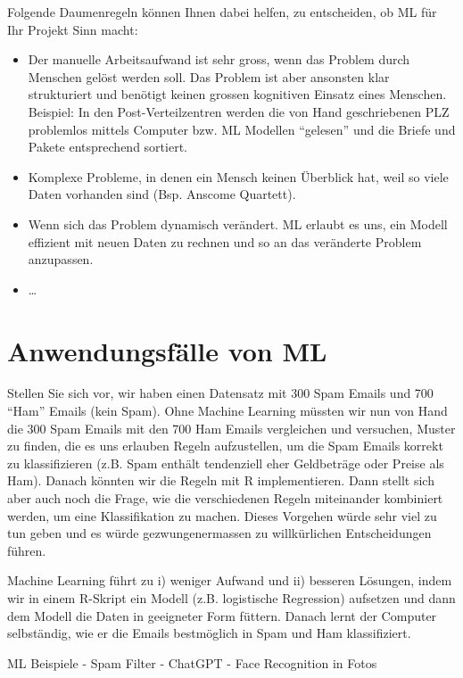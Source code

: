 \documentclass[
]{book}
\providecommand{\tightlist}{%
  \setlength{\itemsep}{0pt}\setlength{\parskip}{0pt}}
\begin{document}
Folgende Daumenregeln können Ihnen dabei helfen, zu entscheiden, ob ML für Ihr Projekt Sinn macht:

\begin{itemize}
\tightlist
\item
  Der manuelle Arbeitsaufwand ist sehr gross, wenn das Problem durch Menschen gelöst werden soll. Das Problem ist aber ansonsten klar strukturiert und benötigt keinen grossen kognitiven Einsatz eines Menschen. Beispiel: In den Post-Verteilzentren werden die von Hand geschriebenen PLZ problemlos mittels Computer bzw. ML Modellen ``gelesen'' und die Briefe und Pakete entsprechend sortiert.
\item
  Komplexe Probleme, in denen ein Mensch keinen Überblick hat, weil so viele Daten vorhanden sind (Bsp. Anscome Quartett).
\item
  Wenn sich das Problem dynamisch verändert. ML erlaubt es uns, ein Modell effizient mit neuen Daten zu rechnen und so an das veränderte Problem anzupassen.
\item
  \ldots{}
\end{itemize}

\hypertarget{anwendungsfuxe4lle-von-ml}{%
\section{Anwendungsfälle von ML}\label{anwendungsfuxe4lle-von-ml}}

Stellen Sie sich vor, wir haben einen Datensatz mit 300 Spam Emails und 700 ``Ham'' Emails (kein Spam). Ohne Machine Learning müssten wir nun von Hand die 300 Spam Emails mit den 700 Ham Emails vergleichen und versuchen, Muster zu finden, die es uns erlauben Regeln aufzustellen, um die Spam Emails korrekt zu klassifizieren (z.B. Spam enthält tendenziell eher Geldbeträge oder Preise als Ham). Danach könnten wir die Regeln mit R implementieren. Dann stellt sich aber auch noch die Frage, wie die verschiedenen Regeln miteinander kombiniert werden, um eine Klassifikation zu machen. Dieses Vorgehen würde sehr viel zu tun geben und es würde gezwungenermassen zu willkürlichen Entscheidungen führen.

Machine Learning führt zu i) weniger Aufwand und ii) besseren Lösungen, indem wir in einem R-Skript ein Modell (z.B. logistische Regression) aufsetzen und dann dem Modell die Daten in geeigneter Form füttern. Danach lernt der Computer selbständig, wie er die Emails bestmöglich in Spam und Ham klassifiziert.

ML Beispiele
- Spam Filter
- ChatGPT
- Face Recognition in Fotos
\end{document}
